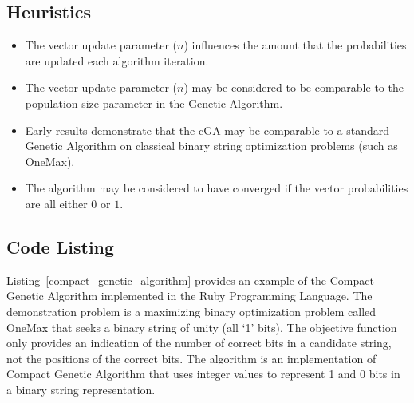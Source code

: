 \subsection{Heuristics}
\begin{itemize}
	\item The vector update parameter ($n$) influences the amount that the probabilities are updated each algorithm iteration.
	\item The vector update parameter ($n$) may be considered to be comparable to the population size parameter in the Genetic Algorithm.
	\item Early results demonstrate that the cGA may be comparable to a standard Genetic Algorithm on classical binary string optimization problems (such as OneMax).	
	\item The algorithm may be considered to have converged if the vector probabilities are all either $0$ or $1$.
\end{itemize}

\subsection{Code Listing}
Listing~\ref{compact_genetic_algorithm} provides an example of the Compact Genetic Algorithm implemented in the Ruby Programming Language. 
The demonstration problem is a maximizing binary optimization problem called OneMax that seeks a binary string of unity (all `1' bits). The objective function only provides an indication of the number of correct bits in a candidate string, not the positions of the correct bits.
The algorithm is an implementation of Compact Genetic Algorithm that uses integer values to represent 1 and 0 bits in a binary string representation. 

